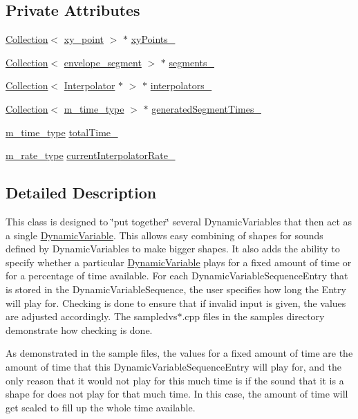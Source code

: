 \subsection*{Private Attributes}
\begin{CompactItemize}
\item 
\hyperlink{classCollection}{Collection}$<$ \hyperlink{structxy__point}{xy\_\-point} $>$ $\ast$ \hyperlink{classDynamicVariableSequence_r0}{xy\-Points\_\-}
\item 
\hyperlink{classCollection}{Collection}$<$ \hyperlink{structenvelope__segment}{envelope\_\-segment} $>$ $\ast$ \hyperlink{classDynamicVariableSequence_r1}{segments\_\-}
\item 
\hyperlink{classCollection}{Collection}$<$ \hyperlink{classInterpolator}{Interpolator} $\ast$ $>$ $\ast$ \hyperlink{classDynamicVariableSequence_r2}{interpolators\_\-}
\item 
\hyperlink{classCollection}{Collection}$<$ \hyperlink{Types_8h_a2}{m\_\-time\_\-type} $>$ $\ast$ \hyperlink{classDynamicVariableSequence_r3}{generated\-Segment\-Times\_\-}
\item 
\hyperlink{Types_8h_a2}{m\_\-time\_\-type} \hyperlink{classDynamicVariableSequence_r4}{total\-Time\_\-}
\item 
\hyperlink{Types_8h_a4}{m\_\-rate\_\-type} \hyperlink{classDynamicVariableSequence_r5}{current\-Interpolator\-Rate\_\-}
\end{CompactItemize}


\subsection{Detailed Description}
This class is designed to \char`\"{}put together\char`\"{} several Dynamic\-Variables that then act as a single \hyperlink{classDynamicVariable}{Dynamic\-Variable}. This allows easy combining of shapes for sounds defined by Dynamic\-Variables to make bigger shapes. It also adds the ability to specify whether a particular \hyperlink{classDynamicVariable}{Dynamic\-Variable} plays for a fixed amount of time or for a percentage of time available. For each Dynamic\-Variable\-Sequence\-Entry that is stored in the Dynamic\-Variable\-Sequence, the user specifies how long the Entry will play for. Checking is done to ensure that if invalid input is given, the values are adjusted accordingly. The sampledvs$\ast$.cpp files in the samples directory demonstrate how checking is done.

As demonstrated in the sample files, the values for a fixed amount of time are the amount of time that this Dynamic\-Variable\-Sequence\-Entry will play for, and the only reason that it would not play for this much time is if the sound that it is a shape for does not play for that much time. In this case, the amount of time will get scaled to fill up the whole time available.

